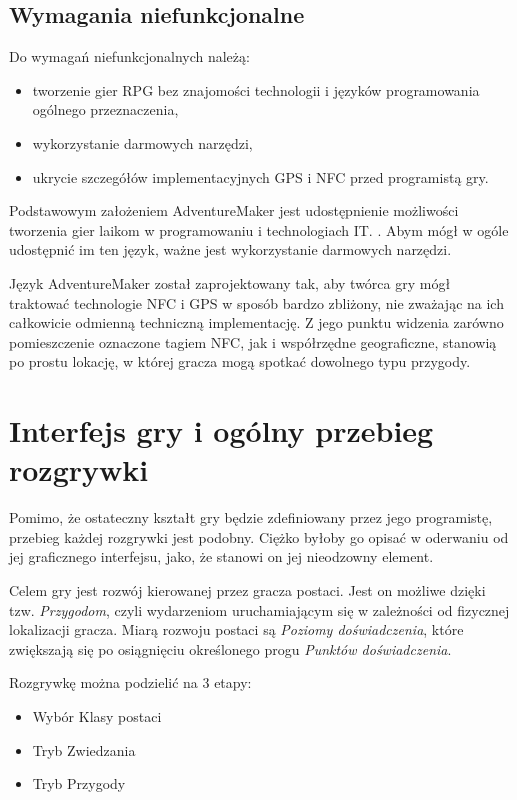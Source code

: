 \documentclass[openright]{xmgr}
\begin{document}
\section{Wymagania niefunkcjonalne}
Do wymagań niefunkcjonalnych należą:
\begin{itemize}
	\item tworzenie gier RPG bez znajomości technologii i języków programowania ogólnego przeznaczenia,
	\item wykorzystanie darmowych narzędzi,
	\item ukrycie szczegółów implementacyjnych GPS i NFC przed programistą gry.
\end{itemize}

Podstawowym założeniem AdventureMaker jest udostępnienie możliwości tworzenia gier laikom w programowaniu i technologiach IT. . Abym mógł w ogóle udostępnić im ten język, ważne jest wykorzystanie darmowych narzędzi.

Język AdventureMaker został zaprojektowany tak, aby twórca gry mógł traktować technologie NFC i GPS w sposób bardzo zbliżony, nie zważając na ich  całkowicie odmienną techniczną implementację. Z jego punktu widzenia zarówno pomieszczenie oznaczone tagiem NFC, jak i współrzędne geograficzne, stanowią po prostu lokację, w której gracza mogą spotkać dowolnego typu przygody. 

\chapter{Interfejs gry i ogólny przebieg rozgrywki}

Pomimo, że ostateczny kształt gry będzie zdefiniowany przez jego programistę, przebieg każdej rozgrywki jest podobny. Ciężko byłoby go opisać w oderwaniu od jej graficznego interfejsu, jako, że stanowi on jej nieodzowny element. 

Celem gry jest rozwój kierowanej przez gracza postaci. Jest on możliwe dzięki tzw. \textit{Przygodom}, czyli wydarzeniom uruchamiającym się w zależności od fizycznej lokalizacji gracza. Miarą rozwoju postaci są \textit{Poziomy doświadczenia}, które zwiększają się po osiągnięciu określonego progu \textit{Punktów doświadczenia}.

Rozgrywkę można podzielić na 3 etapy:
\begin{itemize}
	\item Wybór Klasy postaci
	\item Tryb Zwiedzania
	\item Tryb Przygody 
\end{itemize}
\end{document}
